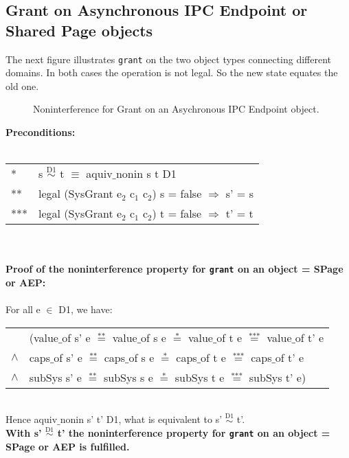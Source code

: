 \subsection{Grant on Asynchronous IPC Endpoint or Shared Page objects}
The next figure illustrates \texttt{grant} on the two object types connecting different domains. In both cases the operation is not legal. So the new state equates the old one.
\begin{figure}[H]
\caption{Noninterference for Grant on an Asychronous IPC Endpoint object.}
\end{figure}
\textbf{Preconditions:} \\ \\
\begin{tabular}{ll}
* & s $\overset{\text{D1}}{\sim}$ t $\equiv$ aquiv$\_$nonin s t D1	\\ 
** & legal (SysGrant e$_2$ c$_1$ c$_2$) s = false $\Rightarrow$ s' = s \\ 
*** & legal (SysGrant e$_2$ c$_1$ c$_2$) t = false $\Rightarrow$ t' = t
\end{tabular}\\ \\ 
\textbf{Proof of the noninterference property for \texttt{grant} on an object = SPage or AEP:}\\ \\
For all e $\in$ D1, we have: \\ 
\begin{tabular}{ll}
& (value$\_$of s' e $\overset{\text{**}}{=}$ value$\_$of s e $\overset{\text{*}}{=}$ value$\_$of t e $\overset{\text{***}}{=}$ value$\_$of t' e \\
$\wedge$ & caps$\_$of s' e $\overset{\text{**}}{=}$ caps$\_$of s e $\overset{\text{*}}{=}$ caps$\_$of t e $\overset{\text{***}}{=}$ caps$\_$of t' e \\
$\wedge$ & subSys s' e $\overset{\text{**}}{=}$ subSys s e $\overset{\text{*}}{=}$ subSys t e $\overset{\text{***}}{=}$ subSys t' e)
\end{tabular} \\
Hence aquiv$\_$nonin s' t' D1, what is equivalent to s' $\overset{\text{D1}}{\sim}$ t'. \\ 
\textbf{With s' $\overset{\text{D1}}{\sim}$ t' the noninterference property for \texttt{grant} on an object = SPage or AEP is fulfilled.} 